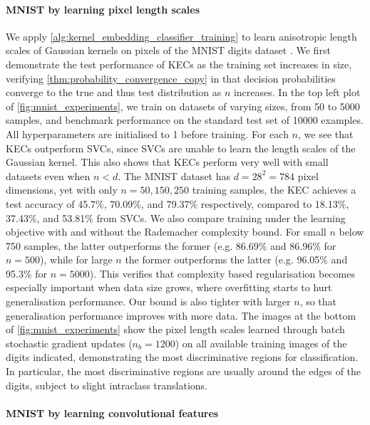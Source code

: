 \documentclass{article}
\begin{document}
	\paragraph{MNIST by learning pixel length scales}
	
		We apply \cref{alg:kernel_embedding_classifier_training} to learn anisotropic length scales of Gaussian kernels on pixels of the MNIST digits dataset \citep{lecun1998gradient}. We first demonstrate the test performance of KECs as the training set increases in size, verifying \cref{thm:probability_convergence_copy} in that decision probabilities converge to the true and thus test distribution as $n$ increases. In the top left plot of \cref{fig:mnist_experiments}, we train on datasets of varying sizes, from 50 to 5000 samples, and benchmark performance on the standard test set of 10000 examples. All hyperparameters are initialised to 1 before training. For each $n$, we see that KECs outperform SVCs, since SVCs are unable to learn the length scales of the Gaussian kernel. This also shows that KECs perform very well with small datasets even when $n < d$. The MNIST dataset has $d = 28^{2} = 784$ pixel dimensions, yet with only $n = 50, 150, 250$ training samples, the KEC achieves a test accuracy of 45.7\%, 70.09\%, and 79.37\% respectively, compared to 18.13\%, 37.43\%, and 53.81\% from SVCs. We also compare training under the learning objective with and without the Rademacher complexity bound. For small $n$ below 750 samples, the latter outperforms the former (e.g. 86.69\% and 86.96\% for $n = 500$), while for large $n$ the former outperforms the latter (e.g. 96.05\% and 95.3\% for $n= 5000$). This verifies that complexity based regularisation becomes especially important when data size grows, where overfitting starts to hurt generalisation performance. Our bound is also tighter with larger $n$, so that generalisation performance improves with more data. The images at the bottom of \cref{fig:mnist_experiments} show the pixel length scales learned through batch stochastic gradient updates ($n_{b} = 1200$) on all available training images of the digits indicated, demonstrating the most discriminative regions for classification. In particular, the most discriminative regions are usually around the edges of the digits, subject to slight intraclass translations. 
		
	\paragraph{MNIST by learning convolutional features}
	
\end{document}
